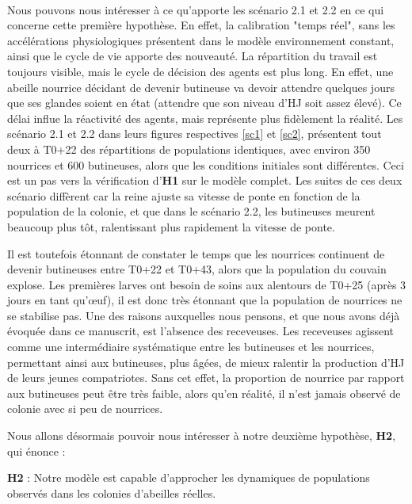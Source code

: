 		\paragraph{}
		Nous pouvons nous intéresser à ce qu'apporte les scénario 2.1 et 2.2 en ce qui concerne cette première hypothèse. En effet, la calibration "temps réel", sans les accélérations physiologiques présentent dans le modèle environnement constant, ainsi que le cycle de vie apporte des nouveauté. La répartition du travail est toujours visible, mais le cycle de décision des agents est plus long. En effet, une abeille nourrice décidant de devenir butineuse va devoir attendre quelques jours que ses glandes soient en état (attendre que son niveau d'HJ soit assez élevé). Ce délai influe la réactivité des agents, mais représente plus fidèlement la réalité. Les scénario 2.1 et 2.2 dans leurs figures respectives \ref{sc1} et \ref{sc2}, présentent tout deux à T0+22 des répartitions de populations identiques, avec environ 350 nourrices et 600 butineuses, alors que les conditions initiales sont différentes. Ceci est un pas vers la vérification d'\textbf{H1} sur le modèle complet. Les suites de ces deux scénario diffèrent car la reine ajuste sa vitesse de ponte en fonction de la population de la colonie, et que dans le scénario 2.2, les butineuses meurent beaucoup plus tôt, ralentissant plus rapidement la vitesse de ponte.
		
		Il est toutefois étonnant de constater le temps que les nourrices continuent de devenir butineuses entre T0+22 et T0+43, alors que la population du couvain explose. Les premières larves ont besoin de soins aux alentours de T0+25 (après 3 jours en tant qu'œuf), il est donc très étonnant que la population de nourrices ne se stabilise pas. Une des raisons auxquelles nous pensons, et que nous avons déjà évoquée dans ce manuscrit, est l'absence des receveuses. Les receveuses agissent comme une intermédiaire systématique entre les butineuses et les nourrices, permettant ainsi aux butineuses, plus âgées, de mieux ralentir la production d'HJ de leurs jeunes compatriotes. Sans cet effet, la proportion de nourrice par rapport aux butineuses peut être très faible, alors qu'en réalité, il n'est jamais observé de colonie avec si peu de nourrices.
		

		Nous allons désormais pouvoir nous intéresser à notre deuxième hypothèse, \textbf{H2}, qui énonce : 
		
		 \textbf{H2} : Notre modèle est capable d'approcher les dynamiques de populations observés dans les colonies d'abeilles réelles.
		 
